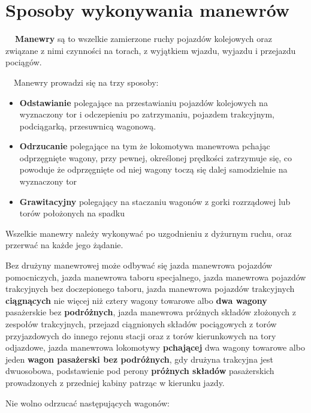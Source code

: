 \chapter{Sposoby wykonywania manewrów}

\textbf{\ \ Manewry} są to wszelkie zamierzone ruchy pojazdów kolejowych oraz związane z nimi czynności na torach, z wyjątkiem wjazdu, wyjazdu i przejazdu pociągów.

\ \ Manewry prowadzi się na trzy sposoby:

\begin{itemize}
\item \textbf{Odstawianie} polegające na przestawianiu pojazdów kolejowych na wyznaczony tor i odczepieniu po
zatrzymaniu, pojazdem trakcyjnym, podciągarką, przesuwnicą wagonową.
\item \textbf{Odrzucanie} polegające na tym że lokomotywa manewrowa pchając odprzęgnięte wagony, przy pewnej, określonej
prędkości zatrzymuje się, co powoduje że odprzęgnięte od niej wagony toczą się dalej samodzielnie na wyznaczony tor
\item \textbf{Grawitacyjny} polegający na staczaniu wagonów z gorki rozrządowej lub torów położonych na spadku
\end{itemize}

Wszelkie manewry należy wykonywać po uzgodnieniu z dyżurnym ruchu, oraz przerwać na każde jego żądanie. 

Bez drużyny manewrowej może odbywać się jazda manewrowa pojazdów pomocniczych, jazda manewrowa taboru specjalnego, jazda manewrowa pojazdów trakcyjnych bez doczepionego taboru, jazda manewrowa pojazdów trakcyjnych \textbf{ciągnących} nie więcej niż cztery wagony towarowe albo \textbf{dwa wagony} pasażerskie bez \textbf{podróżnych}, jazda manewrowa próżnych składów złożonych z zespołów trakcyjnych, przejazd ciągnionych składów pociągowych z torów przyjazdowych do innego rejonu stacji oraz z torów kierunkowych na tory odjazdowe, jazda manewrowa lokomotywy \textbf{pchającej} dwa wagony towarowe albo jeden \textbf{wagon pasażerski bez podróżnych}, gdy drużyna trakcyjna jest dwuosobowa, podstawienie pod perony \textbf{próżnych składów} pasażerskich prowadzonych z przedniej kabiny patrząc w kierunku jazdy.

Nie wolno odrzucać następujących wagonów:

